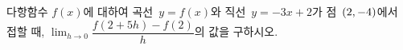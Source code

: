 다항함수 $f(x)$에 대하여 곡선~$y=f(x)$와 직선~$y=-3x+2$가 점~$(2{,}\mkern3mu\mathopen{}-4)$에서 접할 때, $\displaystyle\lim_{h\to 0}\dfrac{f(2+5h)-f(2)}{h}$의 값을 구하시오.
